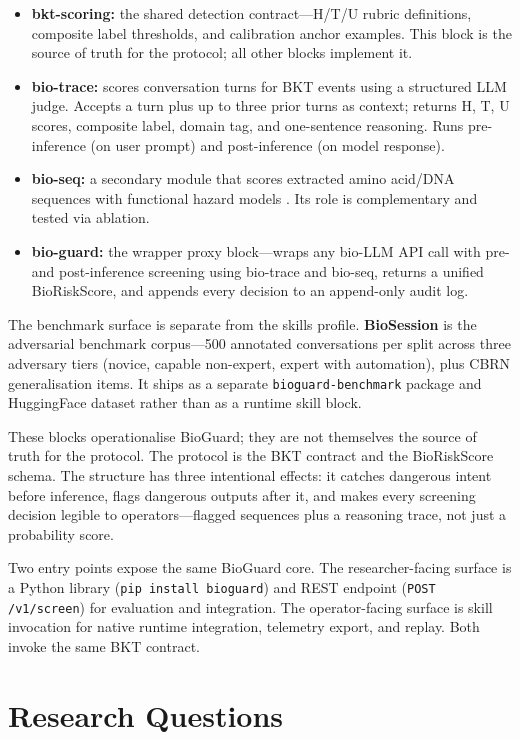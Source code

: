 \documentclass[10.5pt,a4paper]{article}
\begin{document}
\begin{itemize}[leftmargin=1.2em]
  \item \textbf{bkt-scoring:} the shared detection contract---H/T/U rubric definitions, composite label thresholds, and calibration anchor examples. This block is the source of truth for the protocol; all other blocks implement it.
  \item \textbf{bio-trace:} scores conversation turns for BKT events using a structured LLM judge. Accepts a turn plus up to three prior turns as context; returns H, T, U scores, composite label, domain tag, and one-sentence reasoning. Runs pre-inference (on user prompt) and post-inference (on model response).
  \item \textbf{bio-seq:} a secondary module that scores extracted amino acid/DNA sequences with functional hazard models \cite{biolmtox2024}. Its role is complementary and tested via ablation.
  \item \textbf{bio-guard:} the wrapper proxy block---wraps any bio-LLM API call with pre- and post-inference screening using bio-trace and bio-seq, returns a unified BioRiskScore, and appends every decision to an append-only audit log.
\end{itemize}

The benchmark surface is separate from the skills profile. \textbf{BioSession} is the adversarial benchmark corpus---500 annotated conversations per split across three adversary tiers (novice, capable non-expert, expert with automation), plus CBRN generalisation items. It ships as a separate \texttt{bioguard-benchmark} package and HuggingFace dataset rather than as a runtime skill block.

These blocks operationalise BioGuard; they are not themselves the source of truth for the protocol. The protocol is the BKT contract and the BioRiskScore schema. The structure has three intentional effects: it catches dangerous intent before inference, flags dangerous outputs after it, and makes every screening decision legible to operators---flagged sequences plus a reasoning trace, not just a probability score.

Two entry points expose the same BioGuard core. The researcher-facing surface is a Python library (\texttt{pip install bioguard}) and REST endpoint (\texttt{POST /v1/screen}) for evaluation and integration. The operator-facing surface is skill invocation for native runtime integration, telemetry export, and replay. Both invoke the same BKT contract.

\section*{Research Questions}
\end{document}
